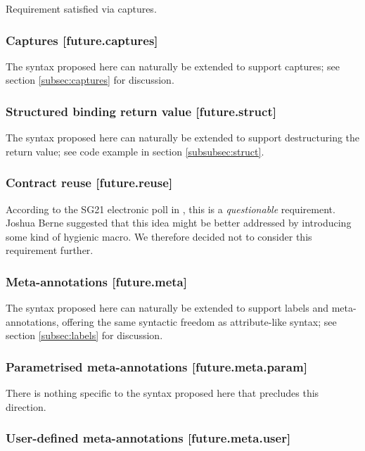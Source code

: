 Requirement satisfied via captures.

\subsubsection{Captures  [future.captures]}

The syntax proposed here can naturally be extended to support captures; see section \ref{subsec:captures} for discussion.

\subsubsection{Structured binding return value  [future.struct]}

The syntax proposed here can naturally be extended to support destructuring the return value; see code example in section \ref{subsubsec:struct}.

\subsubsection{Contract reuse  [future.reuse]}

According to the SG21 electronic poll in \cite{P2885R2}, this is a \emph{questionable} requirement. Joshua Berne suggested that this idea might be better addressed by introducing some kind of hygienic macro. We therefore decided not to consider this requirement further.

\subsubsection{Meta-annotations  [future.meta]}

The syntax proposed here can naturally be extended to support labels and meta-annotations, offering the same syntactic freedom as attribute-like syntax; see section \ref{subsec:labels} for discussion.

\subsubsection{Parametrised meta-annotations  [future.meta.param]}

There is nothing specific to the syntax proposed here that precludes this direction.

\subsubsection{User-defined meta-annotations  [future.meta.user]}

